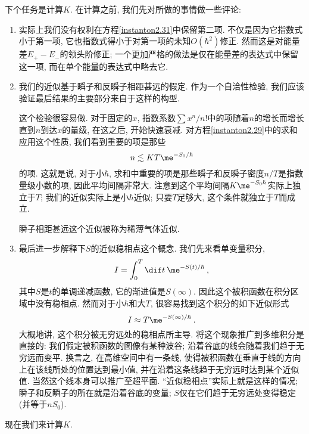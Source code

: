 下个任务是计算$K$. 在计算之前, 我们先对所做的事情做一些评论:
\begin{enumerate}
    \item 实际上我们没有权利在方程\eqref{instanton2.31}中保留第二项. 不仅是因为它指数式小于第一项, 它也指数式得小于对第一项的未知$O(\hbar^{2})$修正. 然而这是对能量差$E_{+}-E_{-}$的领头阶修正; 一个更加严格的做法是仅在能量差的表达式中保留这一项, 而在单个能量的表达式中略去它.
    \item 我们的近似基于瞬子和反瞬子相距甚远的假定. 作为一个自洽性检验, 我们应该验证最后结果的主要部分来自于这样的构型. 
    
    这个检验很容易做. 对于固定的$x$, 指数系数$\sum x^{n}/n!$中的项随着$n$的增长而增长直到$n$到达$x$的量级, 在这之后, 开始快速衰减. 对方程\eqref{instanton2.29}中的求和应用这个性质, 我们看到重要的项是那些
    \begin{equation}
        n \lesssim KT \me^{-S_{0}/\hbar} \label{instanton2.33}
    \end{equation}
    的项. 这就是说, 对于小$\hbar$, 求和中重要的项是那些瞬子和反瞬子密度$n/T$是指数量级小数的项, 因此平均间隔非常大. 注意到这个平均间隔$K\me^{-S_{0}\hbar}$实际上独立于$T$; 我们的近似实际上是小$\hbar$近似; 只要$T$足够大, 这个条件就独立于$T$而成立.

    瞬子相距甚远这个近似被称为稀薄气体近似.
    \item 最后进一步解释下$S$的近似稳相点这个概念. 我们先来看单变量积分,
    \begin{equation}
        I=\int_{0}^{T} \dif t\: \me^{-S(t)/\hbar} \:, \label{instanton2.34}
    \end{equation}
    其中$S$是$t$的单调递减函数, 它的渐进值是$S(\infty)$. 因此这个被积函数在积分区域中没有稳相点. 然而对于小$\hbar$和大$T$, 很容易找到这个积分的如下近似形式
    \begin{equation}
        I\approx T \me^{-S(\infty)/\hbar} \:. \label{instanton2.35}
    \end{equation}
    大概地讲, 这个积分被无穷远处的稳相点所主导. 将这个现象推广到多维积分是直接的: 我们假定被积函数的图像有某种波谷; 沿着谷底的线会随着我们趋于无穷远而变平. 换言之, 在高维空间中有一条线, 使得被积函数在垂直于线的方向上在该线所处的位置达到最小值, 并在沿着这条线趋于无穷远时达到某个近似值. 当然这个线本身可以推广至超平面. ``近似稳相点''实际上就是这样的情况; 瞬子和反瞬子的所在就是沿着谷底的变量; $S$仅在它们趋于无穷远处变得稳定(并等于$nS_{0}$).
\end{enumerate}
\vspace{0.5cm}
现在我们来计算$K$.

